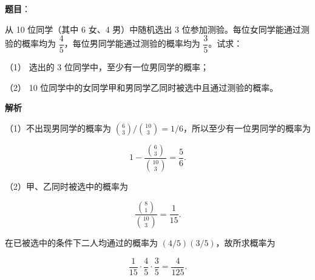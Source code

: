 \begin{answer}

\textbf{题目}：

从 10 位同学（其中 6 女、4 男）中随机选出 3 位参加测验。每位女同学能通过测验的概率均为 $\dfrac45$，每位男同学能通过测验的概率均为 $\dfrac35$。试求：

（1） 选出的 3 位同学中，至少有一位男同学的概率；

（2） 10 位同学中的女同学甲和男同学乙同时被选中且通过测验的概率。

\textbf{解析}


（1）不出现男同学的概率为 $\binom63/\binom{10}3=1/6$，所以至少有一位男同学的概率为

\nopagebreak[4]
\[
1-\frac{\binom63}{\binom{10}3}=\frac56.
\]


（2）甲、乙同时被选中的概率为

\nopagebreak[4]
\[
\frac{\binom81}{\binom{10}3}=\frac1{15}.
\]

在已被选中的条件下二人均通过的概率为 $(4/5)(3/5)$，故所求概率为

\nopagebreak[4]
\[
\frac1{15}\cdot\frac45\cdot\frac35=\frac4{125}.
\]



\end{answer}
